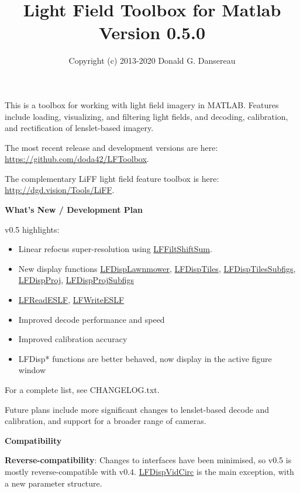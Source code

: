 \documentclass[onecolumn]{article}
\title{
Light Field Toolbox for Matlab\\
{\large Version 0.5.0}
}
\author{Copyright (c) 2013-2020 Donald G. Dansereau}
\date{}
\newcommand{\CiteFunction}[1]{\hyperlink{#1}{\small #1}}
\begin{document}
\maketitle
\thispagestyle{empty}\pagestyle{plain}

This is a toolbox for working with light field imagery in MATLAB. Features include loading, visualizing, and filtering light fields, and decoding, calibration, and rectification of lenslet-based imagery.

The most recent release and development versions are here: \url{https://github.com/doda42/LFToolbox}. 

The complementary LiFF light field feature toolbox is here: \url{http://dgd.vision/Tools/LiFF}.

\vspace{1em}\noindent\textbf{\large{What's New  / Development Plan}}\vspace{0.5em}

v0.5 highlights:
\begin{itemize}[leftmargin=2.8em,itemsep=0em,rightmargin=0.5cm]
\item Linear refocus super-resolution using \CiteFunction{LFFiltShiftSum}.
\item New display functions \CiteFunction{LFDispLawnmower}, \CiteFunction{LFDispTiles}, \CiteFunction{LFDispTilesSubfigs}, \CiteFunction{LFDispProj}, \CiteFunction{LFDispProjSubfigs}
\item \CiteFunction{LFReadESLF}, \CiteFunction{LFWriteESLF}
\item Improved decode performance and speed
\item Improved calibration accuracy
\item LFDisp* functions are better behaved, now display in the active figure window
\end{itemize}
For a complete list, see CHANGELOG.txt.

Future plans include more significant changes to lenslet-based decode and calibration, and support for a broader range of cameras.

\vspace{1em}\noindent\textbf{\large{Compatibility}}\vspace{0.5em}

\textbf{Reverse-compatibility}: Changes to interfaces have been minimised, so v0.5 is mostly reverse-compatible with v0.4. \CiteFunction{LFDispVidCirc} is the main exception, with a new parameter structure.
\end{document}
